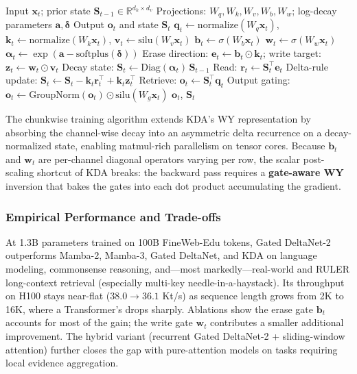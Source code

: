\begin{algorithm}[H]
\caption{Gated DeltaNet-2 Recurrent Forward (Reference Form)}
\begin{algorithmic}[1]
\Require Input $\mathbf{x}_t$; prior state $\mathbf{S}_{t-1} \in \mathbb{R}^{d_k \times d_v}$
\Require Projections: $W_q, W_k, W_v, W_b, W_w$; log-decay parameters $\mathbf{a}, \boldsymbol{\delta}$
\Ensure Output $\mathbf{o}_t$ and state $\mathbf{S}_t$
\State $\mathbf{q}_t \gets \mathrm{normalize}(W_q \mathbf{x}_t)$, $\mathbf{k}_t \gets \mathrm{normalize}(W_k \mathbf{x}_t)$, $\mathbf{v}_t \gets \mathrm{silu}(W_v \mathbf{x}_t)$
\State $\mathbf{b}_t \gets \sigma(W_b \mathbf{x}_t)$ 
\State $\mathbf{w}_t \gets \sigma(W_w \mathbf{x}_t)$ 
\State $\boldsymbol{\alpha}_t \gets \exp(\mathbf{a} - \mathrm{softplus}(\boldsymbol{\delta}))$ 
\State Erase direction: $\mathbf{e}_t \gets \mathbf{b}_t \odot \mathbf{k}_t$; write target: $\mathbf{z}_t \gets \mathbf{w}_t \odot \mathbf{v}_t$
\State Decay state: $\mathbf{S}_t \gets \mathrm{Diag}(\boldsymbol{\alpha}_t)\, \mathbf{S}_{t-1}$
\State Read: $\mathbf{r}_t \gets \mathbf{S}_t^\top \mathbf{e}_t$ 
\State Delta-rule update: $\mathbf{S}_t \gets \mathbf{S}_t - \mathbf{k}_t \mathbf{r}_t^\top + \mathbf{k}_t \mathbf{z}_t^\top$
\State Retrieve: $\mathbf{o}_t \gets \mathbf{S}_t^\top \mathbf{q}_t$
\State Output gating: $\mathbf{o}_t \gets \mathrm{GroupNorm}(\mathbf{o}_t) \odot \mathrm{silu}(W_g \mathbf{x}_t)$
\State \Return $\mathbf{o}_t$, $\mathbf{S}_t$
\end{algorithmic}
\end{algorithm}

The chunkwise training algorithm extends KDA's WY representation by absorbing the channel-wise decay into an asymmetric delta recurrence on a decay-normalized state, enabling matmul-rich parallelism on tensor cores. Because $\mathbf{b}_t$ and $\mathbf{w}_t$ are per-channel diagonal operators varying per row, the scalar post-scaling shortcut of KDA breaks: the backward pass requires a \textbf{gate-aware WY} inversion that bakes the gates into each dot product accumulating the gradient.

\subsubsection{Empirical Performance and Trade-offs}

At 1.3B parameters trained on 100B FineWeb-Edu tokens, Gated DeltaNet-2 outperforms Mamba-2, Mamba-3, Gated DeltaNet, and KDA on language modeling, commonsense reasoning, and---most markedly---real-world and RULER long-context retrieval (especially multi-key needle-in-a-haystack). Its throughput on H100 stays near-flat ($38.0 \to 36.1$ Kt/s) as sequence length grows from 2K to 16K, where a Transformer's drops sharply. Ablations show the erase gate $\mathbf{b}_t$ accounts for most of the gain; the write gate $\mathbf{w}_t$ contributes a smaller additional improvement. The hybrid variant (recurrent Gated DeltaNet-2 + sliding-window attention) further closes the gap with pure-attention models on tasks requiring local evidence aggregation.

